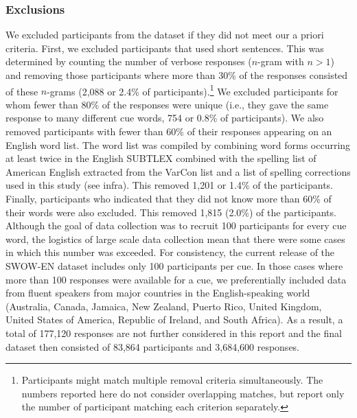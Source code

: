 \documentclass[a4paper,doc,natbib,floatsintext]{apa6}
\begin{document}
\subsubsection{Exclusions}
We excluded participants from the dataset if they did not meet our a priori criteria.
First, we excluded participants that used short sentences. This was determined by counting the number of verbose responses ($n$-gram with $n > 1$) and removing those participants where more than 30\% of the responses consisted of these $n$-grams (2,088 or 2.4\% of participants).\footnote{Participants might match multiple removal criteria simultaneously. The numbers reported here do not consider overlapping matches, but report only the number of participant matching each criterion separately.}
We excluded participants for whom fewer than 80\% of the responses were unique (i.e., they gave the same response to many different cue words, 754 or 0.8\% of participants).
We also removed participants with fewer than 60\% of their responses appearing on an English word list. The word list was compiled by combining word forms occurring at least twice in the English SUBTLEX \citep{BrysbaertNew2009} combined with the spelling list of American English extracted from the VarCon list \citep{Atkinson:2018} and a list of spelling corrections used in this study (see infra). This removed 1,201  or 1.4\% of the participants.
Finally, participants who indicated that they did not know more than 60\% of their words were also excluded. This removed 1,815 (2.0\%) of the participants.
Although the goal of data collection was to recruit 100 participants for every cue word, the logistics of large scale data collection mean that there were some cases in which this number was exceeded. For consistency, the current release of the SWOW-EN dataset includes only 100 participants per cue. In those cases where more than 100 responses were available for a cue, we preferentially included data from fluent speakers from major countries in the English-speaking world (Australia, Canada, Jamaica, New Zealand, Puerto Rico, United Kingdom, United States of America, Republic of Ireland, and South Africa). As a result, a total of 177,120 responses are not further considered in this report and the final dataset then consisted of 83,864 participants and 3,684,600 responses.
\end{document}
